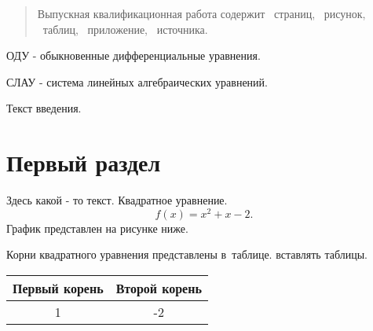 \documentclass{bacgost}
\begin{document}
\begin{abstract}
Выпускная квалификационная работа содержит \pageref*{LastPage}~страниц, ~рисунок, ~таблиц, ~приложение, ~источника.
\end{abstract}


\gosttableofcontents


\begin{lofab}
ОДУ - обыкновенные дифференциальные уравнения.

СЛАУ - система линейных алгебраических уравнений.
\end{lofab}


Текст введения.


\mainpart


\section{Первый раздел}
Здесь какой - то текст. Квадратное уравнение.
\begin{equation}
f(x) = x^2 + x-2.
\end{equation}
График представлен на рисунке ниже.
\begin{gostfigure}
\begin{center}
\label{ris:image_1}
\end{center}
\end{gostfigure}

Корни квадратного уравнения представлены в~таблице. вставлять таблицы.
\begin{gosttable}
\begin{center}
\begin{tabular}{|c|c|}
\hline
Первый корень &  Второй корень \\
\hline
1 & -2  \\
\hline
\end{tabular}
\end{center}
\end{gosttable}
\end{document}
